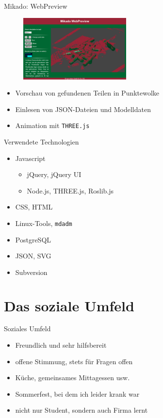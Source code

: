 \documentclass[xcolor=dvipsnames]{beamer}
\begin{document}
\begin{frame}{Mikado: WebPreview}
\begin{figure}[t]
\includegraphics[width=0.5\textwidth]{media/webpreview.png}
\end{figure}
\begin{itemize}
\item Vorschau von gefundenen Teilen in Punktewolke
\item Einlesen von JSON-Dateien und Modelldaten
\item Animation mit \texttt{THREE.js}
\end{itemize}
\end{frame}

\begin{frame}{Verwendete Technologien}
\begin{itemize}
\item Javascript
\begin{itemize}
\item jQuery, jQuery UI
\item Node.js, THREE.js, Roslib.js
\end{itemize}
\item CSS, HTML
\item Linux-Tools, \texttt{mdadm}
\item PostgreSQL
\item JSON, SVG
\item Subversion
\end{itemize}
\end{frame}


\section{Das soziale Umfeld}

\begin{frame}{Soziales Umfeld}
\begin{itemize}
\item Freundlich und sehr hilfsbereit
\item offene Stimmung, stets für Fragen offen
\item Küche, gemeinsames Mittagessen usw.
\item Sommerfest, bei dem ich leider krank war
\item nicht nur Student, sondern auch Firma lernt
\end{itemize}
\end{frame}
\end{document}
